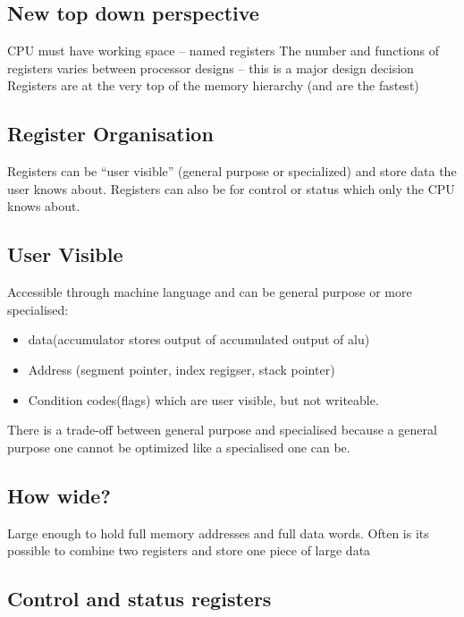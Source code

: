 \subsection{New top down perspective}\label{sub:new_top_down_perspective}

CPU must have working space -- named registers
The number and functions of registers varies between processor designs -- this is a major design decision
Registers are at the very top of the memory hierarchy (and are the fastest)

\subsection{Register Organisation}\label{sub:register_organisation}

Registers can be ``user visible'' (general purpose or specialized) and store data the user knows about.
Registers can also be for control or status which only the CPU knows about.

\subsection{User Visible}\label{sub:user_visible}

Accessible through machine language and can be general purpose or more specialised:
\begin{itemize}
	\item data(accumulator stores output of accumulated output of alu)
	\item Address (segment pointer, index regigser, stack pointer)
	\item Condition codes(flags) which are user visible, but not writeable.
\end{itemize}
There is a trade-off between general purpose and specialised because a general purpose one cannot be optimized like a specialised one can be.

\subsection{How wide?}\label{sub:how_wide_}

Large enough to hold full memory addresses and full data words.
Often is its possible to combine two registers and store one piece of large data

\subsection{Control and status registers}\label{sub:control_and_status_registers}


